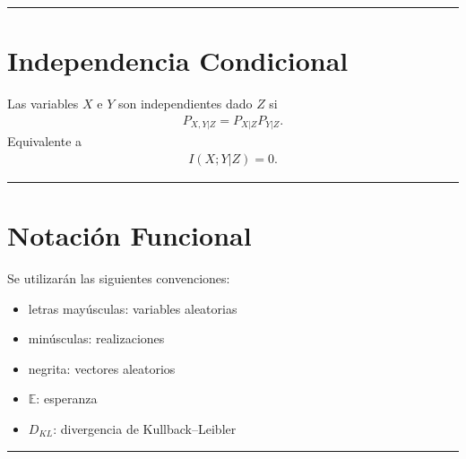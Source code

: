 \documentclass[letterpaper,10pt,english]{jupyterBook}
\begin{document}
\bigskip\hrule\bigskip



\section{Independencia Condicional}
\label{\detokenize{02_mathematical_foundations/formal_definitions:independencia-condicional}}
\sphinxAtStartPar
Las variables \(X\) e \(Y\) son independientes dado \(Z\) si
\begin{equation*}
\begin{split}
P_{X,Y|Z}=P_{X|Z}P_{Y|Z}.
\end{split}
\end{equation*}
\sphinxAtStartPar
Equivalente a
\begin{equation*}
\begin{split}
I(X;Y|Z)=0.
\end{split}
\end{equation*}

\bigskip\hrule\bigskip



\section{Notación Funcional}
\label{\detokenize{02_mathematical_foundations/formal_definitions:notacion-funcional}}
\sphinxAtStartPar
Se utilizarán las siguientes convenciones:
\begin{itemize}
\item {} 
\sphinxAtStartPar
letras mayúsculas: variables aleatorias

\item {} 
\sphinxAtStartPar
minúsculas: realizaciones

\item {} 
\sphinxAtStartPar
negrita: vectores aleatorios

\item {} 
\sphinxAtStartPar
\(\mathbb{E}\): esperanza

\item {} 
\sphinxAtStartPar
\(D_{KL}\): divergencia de Kullback–Leibler

\end{itemize}


\bigskip\hrule\bigskip
\end{document}
